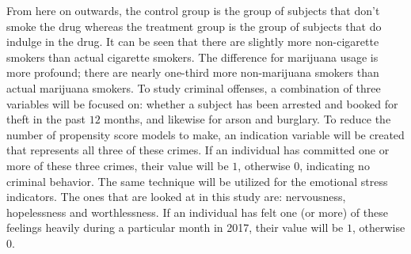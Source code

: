 \documentclass[a4paper, 10pt, conference]{ieeeconf}
\begin{document}
\parindent 10pt From here on outwards, the control group is the group of subjects that don't smoke the drug whereas the treatment group is the group of subjects that do indulge in the drug. It can be seen that there are slightly more non-cigarette smokers than actual cigarette smokers. The difference for marijuana usage is more profound; there are nearly one-third more non-marijuana smokers than actual marijuana smokers. To study criminal offenses, a combination of three variables will be focused on: whether a subject has been arrested and booked for theft in the past $12$ months, and likewise for arson and burglary. To reduce the number of propensity score models to make, an indication variable will be created that represents all three of these crimes. If an individual has committed one or more of these three crimes, their value will be $1$, otherwise $0$, indicating no criminal behavior. The same technique will be utilized for the emotional stress indicators. The ones that are looked at in this study are: nervousness, hopelessness and worthlessness. If an individual has felt one (or more) of these feelings heavily during a particular month in 2017, their value will be $1$, otherwise $0$. 
\end{document}
